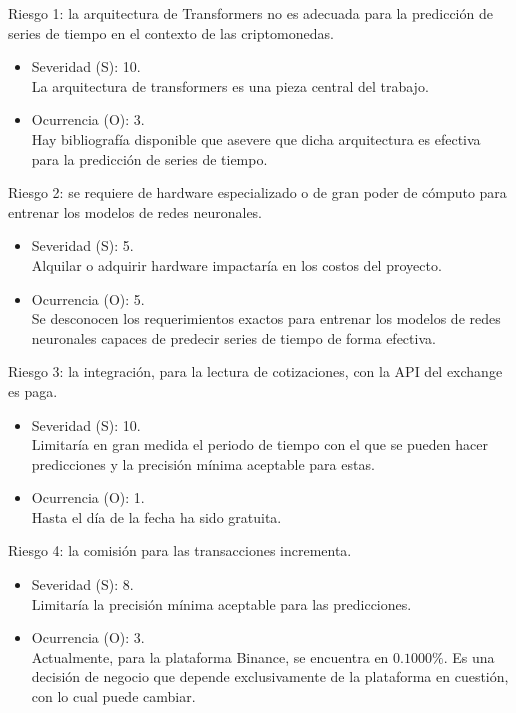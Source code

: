 \documentclass[
    11pt, %
]{charter}
\begin{document}
    Riesgo 1: la arquitectura de Transformers no es adecuada para la predicción de series de tiempo en el contexto de las criptomonedas.
        \begin{itemize}
            \item Severidad (S): 10.\\
            La arquitectura de transformers es una pieza central del trabajo.
            \item Ocurrencia (O): 3.\\
            Hay bibliografía disponible que asevere que dicha arquitectura es efectiva para la predicción de series de tiempo.
        \end{itemize}

        Riesgo 2: se requiere de hardware especializado o de gran poder de cómputo para entrenar los modelos de redes neuronales.
        \begin{itemize}
            \item Severidad (S): 5.\\
            Alquilar o adquirir hardware impactaría en los costos del proyecto.
            \item Ocurrencia (O): 5.\\
            Se desconocen los requerimientos exactos para entrenar los modelos de redes neuronales capaces de predecir series de tiempo de forma efectiva.
        \end{itemize}

        Riesgo 3: la integración, para la lectura de cotizaciones, con la API del exchange es paga.
        \begin{itemize}
        \item Severidad (S): 10.\\
          Limitaría en gran medida el periodo de tiempo con el que se pueden hacer predicciones y la precisión mínima aceptable para estas.
        \item Ocurrencia (O): 1.\\
          Hasta el día de la fecha ha sido gratuita.
        \end{itemize}

        Riesgo 4: la comisión para las transacciones incrementa.
        \begin{itemize}
        \item Severidad (S): 8.\\
          Limitaría la precisión mínima aceptable para las predicciones.
        \item Ocurrencia (O): 3.\\
          Actualmente, para la plataforma Binance, se encuentra en $0.1000\%$. Es una decisión de negocio que depende exclusivamente de la plataforma en cuestión, con lo cual puede cambiar.
        \end{itemize}
\end{document}
